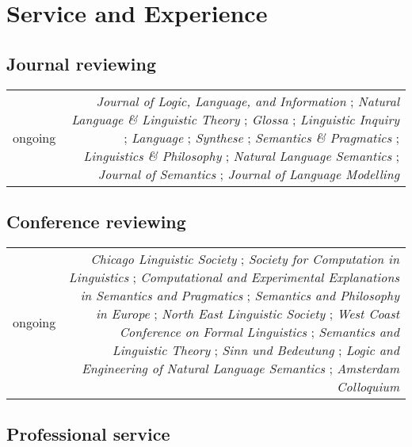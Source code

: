 \documentclass[12pt]{article}
\begin{document}
\medskip

\section*{Service and Experience}

\subsection*{Journal reviewing}

\begin{longtable}{LR}
  ongoing &
    \textit{Journal of Logic, Language, and Information}%
    ;
    \textit{Natural Language \& Linguistic Theory}%
    ;
    \textit{Glossa}%
    ;
    \textit{Linguistic Inquiry}%
    ;
    \textit{Language}%
    ;
    \textit{Synthese}%
    ;
    \textit{Semantics \& Pragmatics}%
    ;
    \textit{Linguistics \& Philosophy}%
    ;
    \textit{Natural Language Semantics}%
    ;
    \textit{Journal of Semantics}%
    ;
    \textit{Journal of Language Modelling}%
\end{longtable}

\subsection*{Conference reviewing}

\begin{longtable}{LR}
  ongoing &
    \textit{Chicago Linguistic Society}%
    ;
    \textit{Society for Computation in Linguistics}%
    ;
    \textit{Computational and Experimental Explanations in Semantics and Pragmatics}%
    ;
    \textit{Semantics and Philosophy in Europe}%
    ;
    \textit{North East Linguistic Society}%
    ;
    \textit{West Coast Conference on Formal Linguistics}%
    ;
    \textit{Semantics and Linguistic Theory}%
    ;
    \textit{Sinn und Bedeutung}%
    ;
    \textit{Logic and Engineering of Natural Language Semantics}%
    ;
    \textit{Amsterdam Colloquium}%
\end{longtable}

\subsection*{Professional service}
\end{document}
